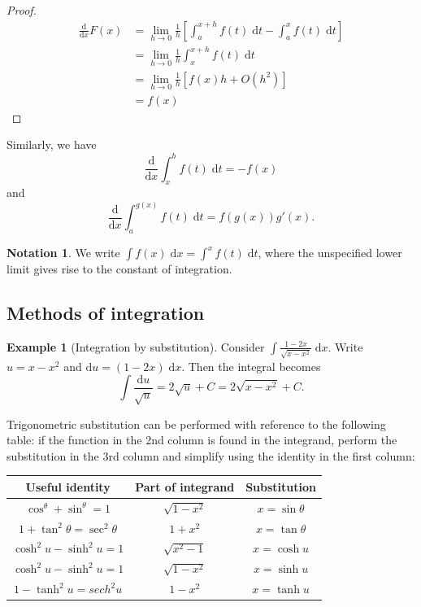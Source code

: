 \documentclass[a4paper]{article}
\theoremstyle{definition}
\newtheorem*{eg}{Example}
\newtheorem*{notation}{Notation}
\renewcommand{\d}{\mathrm{d}}
\begin{document}
\begin{proof}
  \begin{align*}
    \frac{\d}{\d x}F(x) &= \lim_{h\to 0}\frac{1}{h}\left[\int_a^{x+h}f(t)\;\d t - \int_a^x f(t)\;\d t\right]\\
    &= \lim_{h\to 0} \frac{1}{h}\int_x^{x+h}f(t) \;\d t\\
    &= \lim_{h\to 0} \frac{1}{h}[f(x)h + O(h^2)]\\
    &= f(x)
  \end{align*}
\end{proof}
Similarly, we have 
\[
\frac{\d}{\d x}\int_x^b f(t)\;\d t = -f(x)
\]
and
\[
\frac{\d}{\d x}\int_a^{g(x)} f(t)\;\d t = f(g(x))g'(x).
\]

\begin{notation}
  We write $\int f(x)\;\d x= \int^x f(t)\;\d t$, where the unspecified lower limit gives rise to the constant of integration.
\end{notation}

\subsection{Methods of integration}
\begin{eg}[Integration by substitution]
  Consider $\int \frac{1 - 2x}{\sqrt{x - x^2}}\;\d x$. Write $u = x - x^2$ and $\d u = (1 - 2x)\;\d x$. Then the integral becomes
\[
\int \frac{\d u}{\sqrt{u}} = 2\sqrt{u} + C = 2\sqrt{x - x^2} + C.
\]
\end{eg}

Trigonometric substitution can be performed with reference to the following table: if the function in the 2nd column is found in the integrand, perform the substitution in the 3rd column and simplify using the identity in the first column:

\vspace{4pt}
\noindent
\begin{tabular}{ccc}
\toprule
Useful identity                   & Part of integrand & Substitution      \\
\midrule
$\cos^\theta + \sin^\theta = 1$   & $\sqrt{1 - x^2}$  & $x = \sin \theta$ \\
$1 + \tan^2\theta = \sec^2\theta$ & $1 + x^2$         & $x = \tan\theta$  \\
$\cosh^2u - \sinh^2 u = 1$        & $\sqrt{x^2 - 1}$  & $x=\cosh u$       \\
$\cosh^2u - \sinh^2 u = 1$        & $\sqrt{1 - x^2}$  & $x=\sinh u$       \\
$1 - \tanh^2 u = sech^2u$         & $1 - x^2$         & $x = \tanh u$     \\
\bottomrule
\end{tabular}
\end{document}
